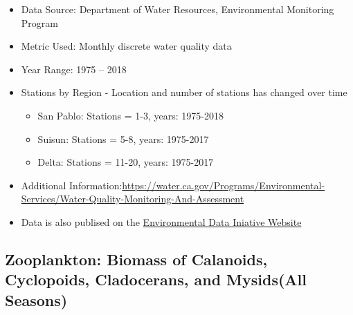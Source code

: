 \documentclass[
]{book}
\providecommand{\tightlist}{%
  \setlength{\itemsep}{0pt}\setlength{\parskip}{0pt}}
\begin{document}
\begin{itemize}
\tightlist
\item
  Data Source: Department of Water Resources, Environmental Monitoring Program
\item
  Metric Used: Monthly discrete water quality data
\item
  Year Range: 1975 -- 2018
\item
  Stations by Region - Location and number of stations has changed over time

  \begin{itemize}
  \tightlist
  \item
    San Pablo: Stations = 1-3, years: 1975-2018
  \item
    Suisun: Stations = 5-8, years: 1975-2017
  \item
    Delta: Stations = 11-20, years: 1975-2017
  \end{itemize}
\item
  Additional Information:\url{https://water.ca.gov/Programs/Environmental-Services/Water-Quality-Monitoring-And-Assessment}
\item
  Data is also publised on the \href{https://doi.org/10.6073/pasta/a215752cb9ac47f9ed9bb0fdb7fc7c19}{Environmental Data Iniative Website}
\end{itemize}

\hypertarget{zooplankton-biomass-of-calanoids-cyclopoids-cladocerans-and-mysidsall-seasons}{%
\subsection{Zooplankton: Biomass of Calanoids, Cyclopoids, Cladocerans, and Mysids(All Seasons)}\label{zooplankton-biomass-of-calanoids-cyclopoids-cladocerans-and-mysidsall-seasons}}
\end{document}

